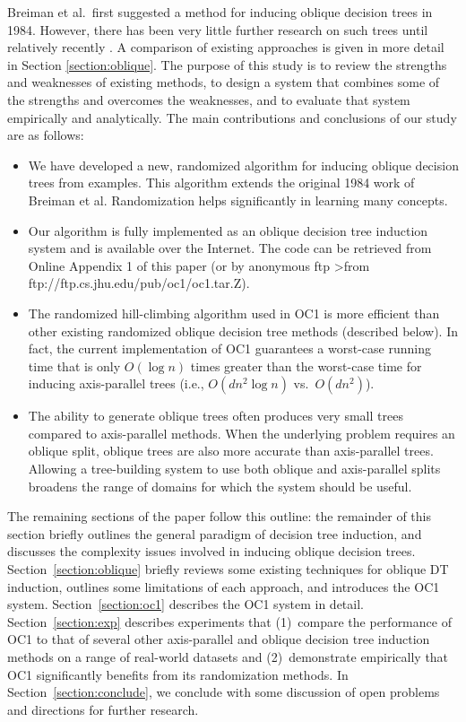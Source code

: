 Breiman et al.\ first suggested a method for inducing oblique decision
trees in 1984.  However, there has been very little further research
on such trees until relatively recently \cite{utgoff/brodley/90,%
heath/etal/93,murthy/etal/93,brodley/utgoff/94}.  A comparison of
existing approaches is given in more detail in Section
\ref{section:oblique}.  The purpose of this study is to review the
strengths and weaknesses of existing methods, to design a system that
combines some of the strengths and overcomes the weaknesses, and to
evaluate that system empirically and analytically.  The main
contributions and conclusions of our study are as follows:
\begin{itemize}
\item We have developed a new, randomized algorithm for inducing
oblique decision trees from examples.  This algorithm extends the
original 1984 work of Breiman et al.  Randomization helps
significantly in learning many concepts.

\item Our algorithm is fully implemented as an oblique decision tree 
induction system and is available over the Internet.  The code can be
retrieved from Online Appendix 1 of this paper (or by anonymous ftp
>from ftp://ftp.cs.jhu.edu/pub/oc1/oc1.tar.Z).

\item The randomized hill-climbing algorithm used in OC1 is more 
efficient than other existing randomized oblique decision tree methods
(described below).  In fact, the current implementation of OC1
guarantees a worst-case running time that is only $O(\log n)$ times
greater than the worst-case time for inducing axis-parallel trees
(i.e., $O(dn^2 \log n)$ vs.\ $O(dn^2)$).

\item The ability to generate oblique trees often produces very
small trees compared to axis-parallel methods.  When the underlying
problem requires an oblique split, oblique trees are also more
accurate than axis-parallel trees.  Allowing a tree-building system to
use both oblique and axis-parallel splits broadens the range of
domains for which the system should be useful.
\end{itemize}

The remaining sections of the paper follow this outline: the remainder
of this section briefly outlines the general paradigm of decision tree
induction, and discusses the complexity issues involved in inducing
oblique decision trees. Section~\ref{section:oblique} briefly reviews
some existing techniques for oblique DT induction, outlines some
limitations of each approach, and introduces the OC1 system.
Section~\ref{section:oc1} describes the OC1 system in detail.
Section~\ref{section:exp} describes experiments that (1)~compare the
performance of OC1 to that of several other axis-parallel and oblique
decision tree induction methods on a range of real-world datasets and
(2)~demonstrate empirically that OC1 significantly benefits from its
randomization methods.  In Section~\ref{section:conclude}, we conclude
with some discussion of open problems and directions for further
research.

